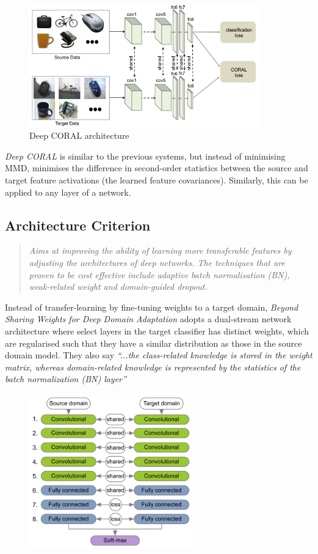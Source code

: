 \documentclass{report}
\newcommand{\quoteit}[1]{\begin{quote}\textit{#1}\end{quote}}
\begin{document}
\begin{figure}[h]
	\centering
	\includegraphics[width=10cm]{imgs/deepcoral}
	\caption{Deep CORAL architecture\parencite{deepcoral}}
	\label{fig:deepcoral}
\end{figure}
\textit{Deep CORAL}\parencite{deepcoral} is similar to the previous systems, but instead of minimising MMD, minimises the difference in second-order statistics between the source and target
feature activations (the learned feature covariances). Similarly, this can be applied to any layer of a network.






\subsection{Architecture Criterion}
\quoteit{Aims at improving the ability of learning more transferable features by adjusting the architectures of deep networks. The techniques that are proven to be cost effective include adaptive batch normalisation (BN), weak-related weight and domain-guided dropout.}

Instead of transfer-learning by fine-tuning weights to a target domain, \textit{Beyond Sharing Weights for Deep Domain Adaptation}\parencite{beyondsharing} adopts a dual-stream network architecture where select layers in the target classifier has distinct weights, which are regularised such that they have a similar distribution as those in the source domain model. They also say \textit{``...the class-related knowledge is stored in the weight matrix, whereas domain-related knowledge is represented by the statistics of the batch normalization (BN) layer''} \\
\begin{figure}
	\centering
	\includegraphics[width=7cm]{imgs/beyondsharing}
	\caption{}
	\label{fig:beyondsharing}
\end{figure}
\end{document}
